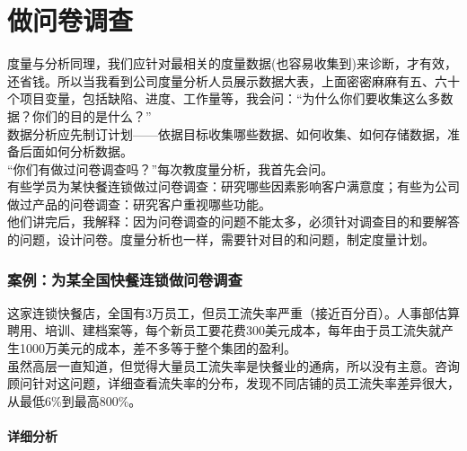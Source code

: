 \chapter{做问卷调查} %


度量与分析同理，我们应针对最相关的度量数据(也容易收集到)来诊断，才有效，还省钱。所以当我看到公司度量分析人员展示数据大表，上面密密麻麻有五、六十个项目变量，包括缺陷、进度、工作量等，我会问：``为什么你们要收集这么多数据？你们的目的是什么？''\\
数据分析应先制订计划------依据目标收集哪些数据、如何收集、如何存储数据，准备后面如何分析数据。\\
``你们有做过问卷调查吗？''每次教度量分析，我首先会问。\\
有些学员为某快餐连锁做过问卷调查：研究哪些因素影响客户满意度；有些为公司做过产品的问卷调查：研究客户重视哪些功能。\\
他们讲完后，我解释：因为问卷调查的问题不能太多，必须针对调查目的和要解答的问题，设计问卷。度量分析也一样，需要针对目的和问题，制定度量计划。\\

\hypertarget{ux6848ux4f8bux4e3aux67d0ux5168ux56fdux5febux9910ux8fdeux9501ux505aux95eeux5377ux8c03ux67e5}{%
\subsection{案例：为某全国快餐连锁做问卷调查}\label{ux6848ux4f8bux4e3aux67d0ux5168ux56fdux5febux9910ux8fdeux9501ux505aux95eeux5377ux8c03ux67e5}}

这家连锁快餐店，全国有3万员工，但员工流失率严重（接近百分百）。人事部估算聘用、培训、建档案等，每个新员工要花费300美元成本，每年由于员工流失就产生1000万美元的成本，差不多等于整个集团的盈利。\\
虽然高层一直知道，但觉得大量员工流失率是快餐业的通病，所以没有主意。咨询顾问针对这问题，详细查看流失率的分布，发现不同店铺的员工流失率差异很大，从最低6\%到最高800\%。

\hypertarget{ux8be6ux7ec6ux5206ux6790}{%
\subsubsection{详细分析}\label{ux8be6ux7ec6ux5206ux6790}}

